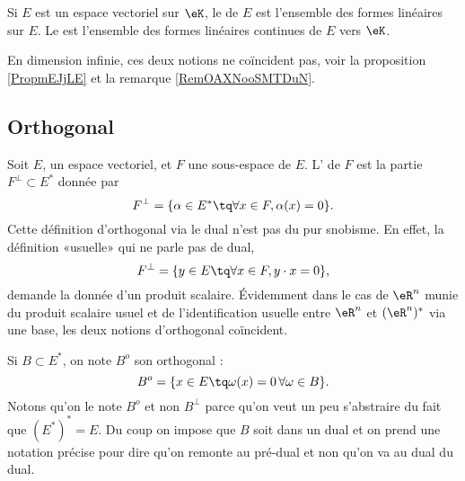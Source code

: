\begin{definition}  \label{DefJPGSHpn}
    Si \( E\) est un espace vectoriel sur \( \eK\), le  de \( E\) est l'ensemble des formes linéaires sur \( E\). Le  est l'ensemble des formes linéaires continues de \( E\) vers \( \eK\).
\end{definition}

En dimension infinie, ces deux notions ne coïncident pas, voir la proposition \ref{PropmEJjLE} et la remarque \ref{RemOAXNooSMTDuN}.

\subsection{Orthogonal}

Soit \( E\), un espace vectoriel, et \( F\) une sous-espace de \( E\). L' de \( F\) est la partie \( F^{\perp}\subset E^*\) donnée par
\begin{equation}    \label{Eqiiyple}
    F^{\perp}=\{ \alpha\in E^*\tq \forall x\in F,\alpha(x)=0 \}.
\end{equation}
Cette définition d'orthogonal via le dual n'est pas du pur snobisme. En effet, la définition «usuelle» qui ne parle pas de dual,
\begin{equation}
    F^{\perp}=\{ y\in E\tq \forall x\in F,y\cdot x=0 \},
\end{equation}
demande la donnée d'un produit scalaire. Évidemment dans le cas de \( \eR^n\) munie du produit scalaire usuel et de l'identification usuelle entre \( \eR^n\) et \( (\eR^n)^*\) via une base, les deux notions d'orthogonal coïncident.

Si \( B\subset E^*\), on note \( B^o\) son orthogonal :
\begin{equation}
    B^o=\{ x\in E\tq \omega(x)=0\,\forall \omega\in B \}.
\end{equation}
Notons qu'on le note \( B^o\) et non \( B^{\perp}\) parce qu'on veut un peu s'abstraire du fait que \( (E^*)^*=E\). Du coup on impose que \( B\) soit dans un dual et on prend une notation précise pour dire qu'on remonte au pré-dual et non qu'on va au dual du dual.

